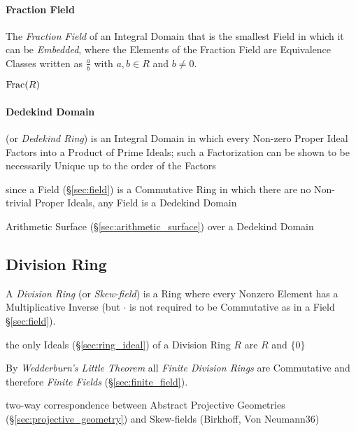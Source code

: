 \paragraph{Fraction Field}\label{sec:fraction_field}\hfill

The \emph{Fraction Field} of an Integral Domain that is the smallest Field in
which it can be \emph{Embedded}, where the Elements of the Fraction Field are
Equivalence Classes written as $\frac{a}{b}$ with $a, b \in R$ and $b \neq 0$.

$\mathrm{Frac}(R)$



\paragraph{Dedekind Domain}\label{sec:dedekind_domain}\hfill

(or \emph{Dedekind Ring}) is an Integral Domain in which every Non-zero Proper
Ideal Factors into a Product of Prime Ideals; such a Factorization can be shown
to be necessarily Unique up to the order of the Factors

since a Field (\S\ref{sec:field}) is a Commutative Ring in which there are no
Non-trivial Proper Ideals, any Field is a Dedekind Domain

\fist Arithmetic Surface (\S\ref{sec:arithmetic_surface}) over a Dedekind Domain



\subsection{Division Ring}\label{sec:division_ring}

A \emph{Division Ring} (or \emph{Skew-field}) is a Ring where every Nonzero
Element has a Multiplicative Inverse (but $\cdot$ is not required to be
Commutative as in a Field \S\ref{sec:field}).

the only Ideals (\S\ref{sec:ring_ideal}) of a Division Ring $R$ are $R$ and
$\{0\}$

By \emph{Wedderburn's Little Theorem} all \emph{Finite Division Rings}
are Commutative and therefore \emph{Finite Fields}
(\S\ref{sec:finite_field}).

two-way correspondence between Abstract Projective Geometries
(\S\ref{sec:projective_geometry}) and Skew-fields (Birkhoff, Von Neumann36)



